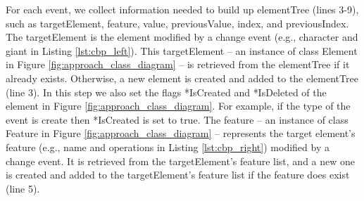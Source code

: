For each \textsf{event}, we collect information needed to build up \textsf{elementTree}  (lines 3-9), such as \textsf{targetElement}, \textsf{feature}, \textsf{value}, \textsf{previousValue}, \textsf{index}, and \textsf{previousIndex}. The \textsf{targetElement} is the element modified by a change event (e.g., \textsf{character} and \textsf{giant} in Listing \ref{lst:cbp_left}). This \textsf{targetElement} -- an instance of class Element in Figure \ref{fig:approach_class_diagram} -- is retrieved from the \textsf{elementTree} if it already exists. Otherwise, a new element is created and added to the \textsf{elementTree} (line 3). In this step we also set the flags \textsf{*IsCreated} and \textsf{*IsDeleted} of the element in Figure \ref{fig:approach_class_diagram}. For example, if the type of the event is \textsf{create} then \textsf{*IsCreated} is set to \textsf{true}. The \textsf{feature} -- an instance of class Feature in Figure \ref{fig:approach_class_diagram} -- represents the target element's feature (e.g., \textsf{name} and \textsf{operations} in Listing \ref{lst:cbp_right}) modified by a change event. It is retrieved from the \textsf{targetElement}'s feature list, and a new one is created and added to the \textsf{targetElement}'s feature list if the feature does exist (line 5). 

